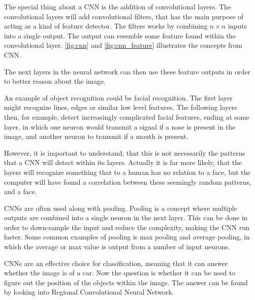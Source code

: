 The special thing about a CNN is the addition of convolutional layers.
The convolutional layers will add convolutional filters, that has the main purpose of acting as a kind of feature detector.
The filters works by combining $n \times n$ inputs into a single output.
The output can resemble some feature found within the convolutional layer.
\autoref{fig:cnn} and \autoref{fig:cnn_feature} illustrates the concepts from CNN.



The next layers in the neural network can then use these feature outputs in order to better reason about the image.

An example of object recognition could be facial recognition.
The first layer might recognize lines, edges or similar low level features.
The following layers then, for example, detect increasingly complicated facial features, ending at some layer, in which one neuron would transmit a signal if a nose is present in the image, and another neuron to transmit if a mouth is present.


However, it is important to understand, that this is not necessarily the patterns that a CNN will detect within its layers.
Actually it is far more likely, that the layers will recognize something that to a human has no relation to a face, but the computer will have found a correlation between these seemingly random patterns, and a face.

CNNs are often used along with pooling.
Pooling is a concept where multiple outputs are combined into a single neuron in the next layer.
This can be done in order to down-sample the input and reduce the complexity, making the CNN run faster.
Some common examples of pooling is max pooling and average pooling, in which the average or max value is output from a number of input neurons.

CNNs are an effective choice for classification, meaning that it can answer whether the image is of a car.
Now the question is whether it can be used to figure out the position of the objects within the image.
The answer can be found by looking into Regional Convolutional Neural Network.


